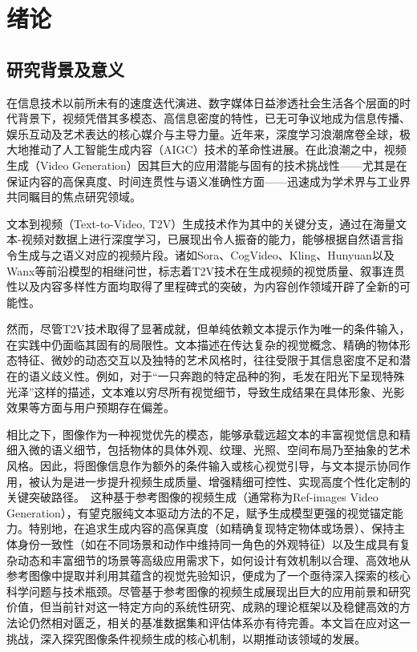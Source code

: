 \cleardoublepage

\section{绪论}
\subsection{研究背景及意义}
在信息技术以前所未有的速度迭代演进、数字媒体日益渗透社会生活各个层面的时代背景下，视频凭借其多模态、高信息密度的特性，已无可争议地成为信息传播、娱乐互动及艺术表达的核心媒介与主导力量。近年来，深度学习浪潮席卷全球，极大地推动了人工智能生成内容（AIGC）技术的革命性进展。在此浪潮之中，视频生成（Video Generation）因其巨大的应用潜能与固有的技术挑战性——尤其是在保证内容的高保真度、时间连贯性与语义准确性方面——迅速成为学术界与工业界共同瞩目的焦点研究领域。

文本到视频（Text-to-Video, T2V）生成技术作为其中的关键分支，通过在海量文本-视频对数据上进行深度学习，已展现出令人振奋的能力，能够根据自然语言指令生成与之语义对应的视频片段。诸如Sora\cite{liu2024sora}、CogVideo\cite{yang2024cogvideox}、Kling\cite{kuaishou2024klingai}、Hunyuan\cite{sun2024hunyuan}以及Wanx\cite{wan2025}等前沿模型的相继问世，标志着T2V技术在生成视频的视觉质量、叙事连贯性以及内容多样性方面均取得了里程碑式的突破\cite{blattmann2023stable,singer2022make,blattmann2023align}，为内容创作领域开辟了全新的可能性。

然而，尽管T2V技术取得了显著成就，但单纯依赖文本提示作为唯一的条件输入，在实践中仍面临其固有的局限性。文本描述在传达复杂的视觉概念、精确的物体形态特征、微妙的动态交互以及独特的艺术风格时，往往受限于其信息密度不足和潜在的语义歧义性。例如，对于“一只奔跑的特定品种的狗，毛发在阳光下呈现特殊光泽”这样的描述，文本难以穷尽所有视觉细节，导致生成结果在具体形象、光影效果等方面与用户预期存在偏差。

相比之下，图像作为一种视觉优先的模态，能够承载远超文本的丰富视觉信息和精细入微的语义细节，包括物体的具体外观、纹理、光照、空间布局乃至抽象的艺术风格。因此，将图像信息作为额外的条件输入或核心视觉引导，与文本提示协同作用，被认为是进一步提升视频生成质量、增强精细可控性、实现高度个性化定制的关键突破路径。\
这种基于参考图像的视频生成（通常称为Ref-images Video Generation），有望克服纯文本驱动方法的不足，赋予生成模型更强的视觉锚定能力。特别地，在追求生成内容的高保真度（如精确复现特定物体或场景）、保持主体身份一致性（如在不同场景和动作中维持同一角色的外观特征）以及生成具有复杂动态和丰富细节的场景等高级应用需求下，如何设计有效机制以合理、高效地从参考图像中提取并利用其蕴含的视觉先验知识，便成为了一个亟待深入探索的核心科学问题与技术瓶颈。尽管基于参考图像的视频生成展现出巨大的应用前景和研究价值，但当前针对这一特定方向的系统性研究、成熟的理论框架以及稳健高效的方法论仍然相对匮乏，相关的基准数据集和评估体系亦有待完善。本文旨在应对这一挑战，深入探究图像条件视频生成的核心机制，以期推动该领域的发展。
